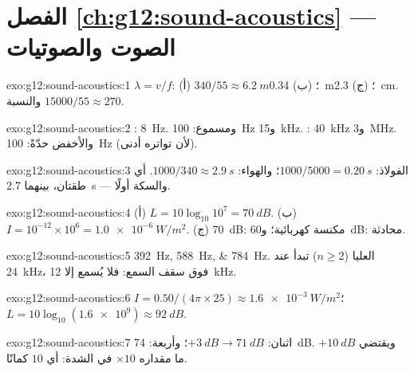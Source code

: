 \section*{الفصل \ref{ch:g12:sound-acoustics} --- الصوت والصوتيات}

\begin{solution}{exo:g12:sound-acoustics:1}
$\lambda = v/f$: (أ) $340/55 \approx \qty{6.2}{m}$؛ (ب)
\qty{0.34}{m}؛ (ج) \qty{2.3}{cm}. والنسبة $15000/55 \approx 270$.
\end{solution}

\begin{solution}{exo:g12:sound-acoustics:2}
: \qty{8}{Hz}. ومسموع: \qty{100}{Hz} و\qty{15}{kHz}.
: \qty{40}{kHz} و\qty{3}{MHz}. والأخفض حدّةً:
\qty{100}{Hz} (لأن تواتره أدنى).
\end{solution}

\begin{solution}{exo:g12:sound-acoustics:3}
الفولاذ: $1000/5000 = \qty{0.20}{s}$؛ والهواء: $1000/340 \approx
\qty{2.9}{s}$. أي طقتان، بينهما \qty{2.7}{s} --- والسكة أولًا.
\end{solution}

\begin{solution}{exo:g12:sound-acoustics:4}
(أ) $L = 10\log_{10}10^{7} = \qty{70}{dB}$. (ب) $I = 10^{-12} \times
10^{6} = \qty{1.0e-6}{W/m^2}$. (ج) \qty{70}{dB}: مكنسة كهربائية؛
و\qty{60}{dB}: محادثة.
\end{solution}

\begin{solution}{exo:g12:sound-acoustics:5}
\qtylist{392;588;784}{Hz}.  العليا ($n \ge 2$) تبدأ عند
\qty{24}{kHz}، فوق سقف السمع: فلا يُسمع إلا
 \qty{12}{kHz}.
\end{solution}

\begin{solution}{exo:g12:sound-acoustics:6}
$I = 0.50/(4\pi \times 25) \approx \qty{1.6e-3}{W/m^2}$؛
$L = 10\log_{10}(\num{1.6e9}) \approx \qty{92}{dB}$.
\end{solution}

\begin{solution}{exo:g12:sound-acoustics:7}
اثنان: $+\qty{3}{dB} \to \qty{71}{dB}$؛ وأربعة: \qty{74}{dB}.
ويقتضي $+\qty{10}{dB}$ ما مقداره $\times 10$ في الشدة: أي $10$ كمانًا.
\end{solution}

